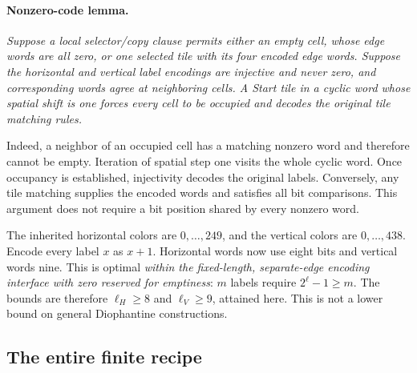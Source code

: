 \paragraph{Nonzero-code lemma.}
\emph{Suppose a local selector/copy clause permits either an empty cell,
whose edge words are all zero, or one selected tile with its four encoded
edge words.  Suppose the horizontal and vertical label encodings are
injective and never zero, and corresponding words agree at neighboring
cells.  A Start tile in a cyclic word whose spatial shift is one forces
every cell to be occupied and decodes the original tile matching rules.}

Indeed, a neighbor of an occupied cell has a matching nonzero word and
therefore cannot be empty.  Iteration of spatial step one visits the
whole cyclic word.  Once occupancy is established, injectivity decodes
the original labels.  Conversely, any tile matching supplies the encoded
words and satisfies all bit comparisons.  This argument does not require
a bit position shared by every nonzero word.

The inherited horizontal colors are $0,\ldots,249$, and the vertical
colors are $0,\ldots,438$.  Encode every label $x$ as $x+1$.  Horizontal
words now use eight bits and vertical words nine.  This is optimal
\emph{within the fixed-length, separate-edge encoding interface with zero
reserved for emptiness}: $m$ labels require $2^\ell-1\ge m$.  The bounds
are therefore $\ell_H\ge8$ and $\ell_V\ge9$, attained here.  This is not
a lower bound on general Diophantine constructions.

\subsection{The entire finite recipe}

